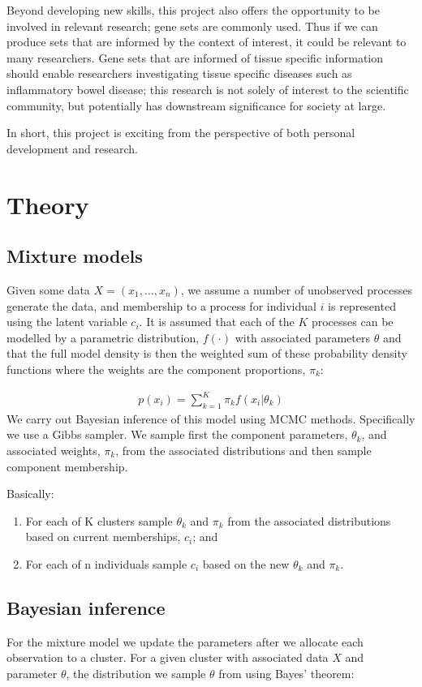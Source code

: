 \documentclass[11pt]{article} %
\begin{document}
	Beyond developing new skills, this project also offers the opportunity to be involved in relevant research; gene sets are commonly used. Thus if we can produce sets that are informed by the context of interest, it could be relevant to many researchers. Gene sets that are informed of tissue specific information should enable researchers investigating tissue specific diseases such as inflammatory bowel disease; this research is not solely of interest to the scientific community, but potentially has downstream significance for society at large.
	
	In short, this project is exciting from the perspective of both personal development and research.
	

	\section{Theory}
	\subsection{Mixture models} \label{mixture_models}
	Given some data $X = (x_1, \ldots, x_n)$, we assume a number of unobserved processes generate the data, and membership to a process for individual $i$ is represented using the latent variable $c_i$. It is assumed that each of the $K$ processes can be modelled by a parametric distribution, $f(\cdot)$ with associated parameters $\theta$ and that the full model density is then the weighted sum of these probability density functions where the weights are the component proportions, $\pi_k$:
	
	\begin{align}
	p(x_i) = \sum_{k=1}^K \pi_k f(x_i | \theta_k)
	\end{align}
	We carry out Bayesian inference of this model using MCMC methods. Specifically we use a Gibbs sampler. We sample first the component parameters, $\theta_k$, and associated weights, $\pi_k$, from the associated distributions and then sample component membership.
	
	Basically:
	\begin{enumerate}
		\item For each of K clusters sample $\theta_k$ and $\pi_k$ from the associated distributions based on current memberships, $c_i$; and
		\item For each of n individuals sample $c_i$ based on the new $\theta_k$ and $\pi_k$.
	\end{enumerate}

	\subsection{Bayesian inference}	
	For the mixture model we update the parameters after we allocate each observation to a cluster. For a given cluster with associated data $X$ and parameter $\theta$, the distribution we sample $\theta$ from using Bayes' theorem:
	
\end{document}
